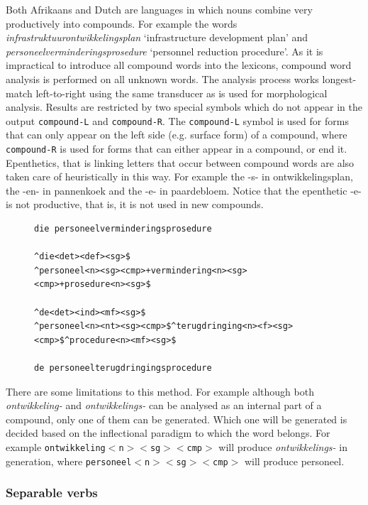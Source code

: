 \documentclass[11pt]{article}
\begin{document}
Both Afrikaans and Dutch are languages in which nouns combine very
productively into compounds. For example the words {\em infrastruktuurontwikkelingsplan}
`infrastructure development plan' and {\em personeelverminderingsprosedure}
`personnel reduction procedure'. As it is impractical to introduce
all compound words into the lexicons, compound word analysis is performed on
all unknown words. The analysis process works longest-match left-to-right
using the same transducer as is used for morphological analysis.
Results are restricted by two special
symbols which do not appear in the output {\small {\tt compound-L}} and {\small {\tt compound-R}}.
The {\small {\tt compound-L}} symbol is used for forms that can only appear on the
left side (e.g. surface form) of a compound, where {\small {\tt compound-R}} is
used for forms that can either appear in a compound, or end it.
Epenthetics, that is linking letters that occur between compound words
are also taken care of heuristically in this way. For example the -s-
in ontwikkelingsplan, the -en- in pannenkoek and the -e- in paardebloem.
 Notice that the epenthetic -e- is not productive, that is, it is not used in new compounds.


\begin{figure}
\begin{small}
\begin{verbatim}
die personeelverminderingsprosedure

^die<det><def><sg>$
^personeel<n><sg><cmp>+vermindering<n><sg><cmp>+prosedure<n><sg>$

^de<det><ind><mf><sg>$
^personeel<n><nt><sg><cmp>$^terugdringing<n><f><sg><cmp>$^procedure<n><mf><sg>$

de personeelterugdringingsprocedure
\end{verbatim}
\end{small}
\end{figure}

There are some limitations to this method. For example although
both {\em ontwikkeling-} and {\em ontwikkelings-} can be analysed as an internal part
of a compound, only one of them can be generated. Which one will be generated
is decided based on the inflectional paradigm to which the word belongs. For
example {\small {\tt ontwikkeling$<$n$><$sg$><$cmp$>$}} will produce {\em ontwikkelings-} in generation,
where {\small {\tt personeel$<$n$><$sg$><$cmp$>$}} will produce personeel.

\subsubsection{Separable verbs}
\end{document}

